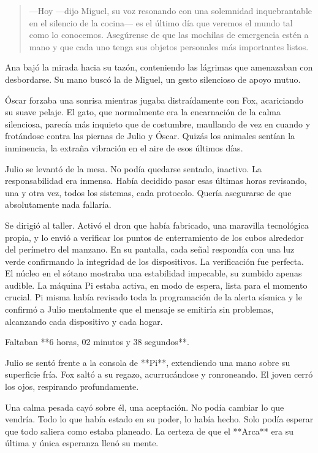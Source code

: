 \documentclass[a4paper,12pt]{book}
\begin{document}
\begin{quote}
    —Hoy —dijo Miguel, su voz resonando con una solemnidad inquebrantable en el silencio de la cocina— es el último día que veremos el mundo tal como lo conocemos. Asegúrense de que las mochilas de emergencia estén a mano y que cada uno tenga sus objetos personales más importantes listos.
\end{quote}

Ana bajó la mirada hacia su tazón, conteniendo las lágrimas que amenazaban con desbordarse. Su mano buscó la de Miguel, un gesto silencioso de apoyo mutuo.

Óscar forzaba una sonrisa mientras jugaba distraídamente con Fox, acariciando su suave pelaje. El gato, que normalmente era la encarnación de la calma silenciosa, parecía más inquieto que de costumbre, maullando de vez en cuando y frotándose contra las piernas de Julio y Óscar. Quizás los animales sentían la inminencia, la extraña vibración en el aire de esos últimos días.

Julio se levantó de la mesa. No podía quedarse sentado, inactivo. La responsabilidad era inmensa. Había decidido pasar esas últimas horas revisando, una y otra vez, todos los sistemas, cada protocolo. Quería asegurarse de que absolutamente nada fallaría.

Se dirigió al taller. Activó el dron que había fabricado, una maravilla tecnológica propia, y lo envió a verificar los puntos de enterramiento de los cubos alrededor del perímetro del manzano. En su pantalla, cada señal respondía con una luz verde confirmando la integridad de los dispositivos. La verificación fue perfecta. El núcleo en el sótano mostraba una estabilidad impecable, su zumbido apenas audible. La máquina Pi estaba activa, en modo de espera, lista para el momento crucial. Pi misma había revisado toda la programación de la alerta sísmica y le confirmó a Julio mentalmente que el mensaje se emitiría sin problemas, alcanzando cada dispositivo y cada hogar.

Faltaban **6 horas, 02 minutos y 38 segundos**.

Julio se sentó frente a la consola de **Pi**, extendiendo una mano sobre su superficie fría. Fox saltó a su regazo, acurrucándose y ronroneando. El joven cerró los ojos, respirando profundamente.

Una calma pesada cayó sobre él, una aceptación. No podía cambiar lo que vendría. Todo lo que había estado en su poder, lo había hecho. Solo podía esperar que todo saliera como estaba planeado. La certeza de que el **Arca** era su última y única esperanza llenó su mente.
\end{document}
